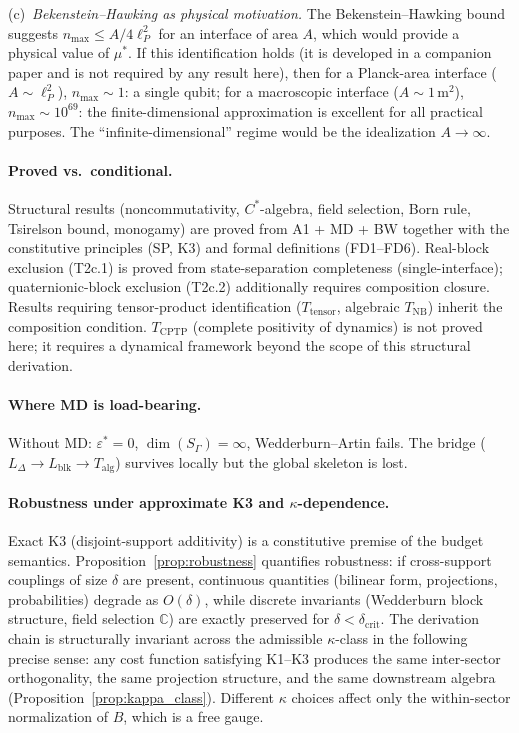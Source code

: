 \documentclass[11pt,a4paper]{article}
\theoremstyle{definition}
\newcommand{\eps}{\varepsilon}
\begin{document}
\noindent(c)~\textit{Bekenstein--Hawking as physical motivation.}  The Bekenstein--Hawking bound suggests $n_{\max} \le A / 4\ell_P^2$ for an interface of area $A$, which would provide a physical value of $\mu^*$.  If this identification holds (it is developed in a companion paper and is not required by any result here), then for a Planck-area interface ($A \sim \ell_P^2$), $n_{\max} \sim 1$: a single qubit; for a macroscopic interface ($A \sim 1\,\mathrm{m}^2$), $n_{\max} \sim 10^{69}$: the finite-dimensional approximation is excellent for all practical purposes.  The ``infinite-dimensional'' regime would be the idealization $A \to \infty$.

\paragraph{Proved vs.\ conditional.}  Structural results (noncommutativity, $C^*$-algebra, field selection, Born rule, Tsirelson bound, monogamy) are proved from A1 + MD + BW together with the constitutive principles (SP, K3) and formal definitions (FD1--FD6).  Real-block exclusion (T2c.1) is proved from state-separation completeness (single-interface); quaternionic-block exclusion (T2c.2) additionally requires composition closure.  Results requiring tensor-product identification ($T_{\mathrm{tensor}}$, algebraic $T_{\mathrm{NB}}$) inherit the composition condition.  $T_{\mathrm{CPTP}}$ (complete positivity of dynamics) is not proved here; it requires a dynamical framework beyond the scope of this structural derivation.

\paragraph{Where MD is load-bearing.}  Without MD: $\eps^* = 0$, $\dim(S_\Gamma) = \infty$, Wedderburn--Artin fails.  The bridge ($L_\Delta \to L_{\mathrm{blk}} \to T_{\mathrm{alg}}$) survives locally but the global skeleton is lost.

\paragraph{Robustness under approximate K3 and $\kappa$-dependence.}  Exact K3 (disjoint-support additivity) is a constitutive premise of the budget semantics.  Proposition~\ref{prop:robustness} quantifies robustness: if cross-support couplings of size $\delta$ are present, continuous quantities (bilinear form, projections, probabilities) degrade as $O(\delta)$, while discrete invariants (Wedderburn block structure, field selection $\mathbb{C}$) are exactly preserved for $\delta < \delta_{\mathrm{crit}}$.  The derivation chain is structurally invariant across the admissible $\kappa$-class in the following precise sense: any cost function satisfying K1--K3 produces the same inter-sector orthogonality, the same projection structure, and the same downstream algebra (Proposition~\ref{prop:kappa_class}).  Different $\kappa$ choices affect only the within-sector normalization of $B$, which is a free gauge.
\end{document}
